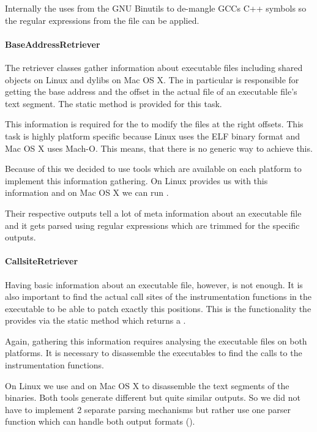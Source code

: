 Internally the  uses  from the GNU Binutils to de-mangle GCCs C++ symbols so the regular expressions from the file can be applied.

\paragraph{BaseAddressRetriever}

The retriever classes gather information about executable files including shared objects on Linux and dylibs on Mac OS X.  The  in particular is responsible for getting the base address and the offset in the actual file of an executable file's text segment.  The static method  is provided for this task.

This information is required for the  to modify the files at the right offsets.  This task is highly platform specific because Linux uses the ELF binary format and Mac OS X uses Mach-O. This means, that there is no generic way to achieve this.

Because of this we decided to use tools which are available on each platform to implement this information gathering.  On Linux  provides us with this information and on Mac OS X we can run .

Their respective outputs tell a lot of meta information about an executable file and it gets parsed using regular expressions which are trimmed for the specific outputs.

\paragraph{CallsiteRetriever}

Having basic information about an executable file, however, is not enough.  It is also important to find the actual call sites of the instrumentation functions in the executable to be able to patch exactly this positions.  This is the functionality the  provides via the static method  which returns a .

Again, gathering this information requires analysing the executable files on both platforms.  It is necessary to disassemble the executables to find the calls to the instrumentation functions.

On Linux we use  and on Mac OS X  to disassemble the text segments of the binaries.  Both tools generate different but quite similar outputs.  So we did not have to implement 2 separate parsing mechanisms but rather use one parser function which can handle both output formats ().

